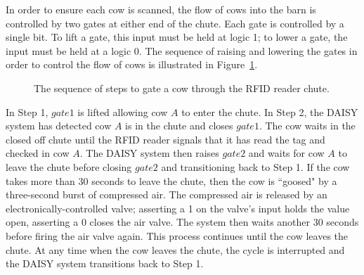 In order to ensure each cow is scanned, the flow of cows
into the barn is controlled by two gates at either end of the chute.  Each 
gate is controlled by a single bit. To lift a gate, this input must be 
held at logic 1; to lower a gate, the input must be held at a logic 0.
The sequence of raising and lowering the gates in order to control the 
flow of cows is illustrated in Figure~\ref{fig:daisy}.

\begin{figure}[ht]
\caption{The sequence of steps to gate a cow through the RFID reader chute.}
\label{fig:daisy}
\end{figure}

In Step 1, $gate1$ is lifted allowing cow $A$ to enter the chute.
In Step 2, the DAISY system has detected cow $A$ is in the chute and 
closes $gate1$.  The cow waits in the closed off chute until the RFID 
reader signals that it has read the tag and checked in cow $A$.  The DAISY system
then raises $gate2$ and waits for cow $A$ to leave the chute before closing $gate2$ 
and transitioning back to Step 1.  If the cow takes more than 30 seconds 
to leave the chute, then the cow is ``goosed" by a three-second burst of compressed air.
The compressed air is released by an electronically-controlled valve; 
asserting a 1 on the valve's input holds the value open, asserting a
0 closes the air valve.
The system then waits another 30 seconds before firing the air
valve again.  This process continues until the cow leaves the chute.
At any time when the cow leaves the chute, the cycle is 
interrupted and the DAISY system transitions back to Step 1.

